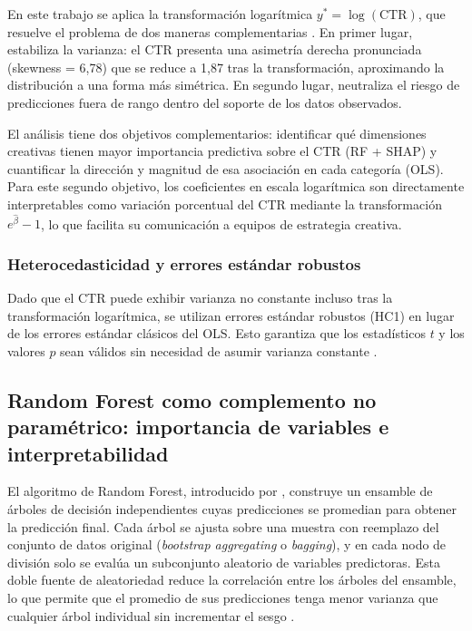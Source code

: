\documentclass[12pt, a4paper]{report}
\begin{document}
En este trabajo se aplica la transformación logarítmica $y^* = \log(\text{CTR})$,
que resuelve el problema de dos maneras complementarias \citep[Cap.~12]{fox2016}. En primer lugar, estabiliza
la varianza: el CTR presenta una asimetría derecha pronunciada (skewness = 6{,}78)
que se reduce a 1{,}87 tras la transformación, aproximando la distribución a una forma
más simétrica. En segundo lugar, neutraliza el riesgo de
predicciones fuera de rango dentro del soporte de los datos observados. 

El análisis tiene dos objetivos complementarios: identificar qué dimensiones creativas
tienen mayor importancia predictiva sobre el CTR (RF + SHAP) y cuantificar la dirección
y magnitud de esa asociación en cada categoría (OLS). Para este segundo objetivo, los
coeficientes en escala logarítmica son directamente interpretables como variación
porcentual del CTR mediante la transformación $e^{\hat{\beta}} - 1$, lo que facilita
su comunicación a equipos de estrategia creativa.

\subsubsection*{Heterocedasticidad y errores estándar robustos}

Dado que el CTR puede exhibir varianza no constante incluso tras la transformación
logarítmica, se utilizan errores estándar robustos (HC1) en lugar de los errores
estándar clásicos del OLS. Esto garantiza que los estadísticos $t$ y los valores $p$
sean válidos sin necesidad de asumir varianza constante \citep{white1980}.

\subsection{Random Forest como complemento no paramétrico:
            importancia de variables e interpretabilidad}

El algoritmo de Random Forest, introducido por \citet{breiman2001}, construye un
ensamble de árboles de decisión independientes cuyas predicciones se promedian para
obtener la predicción final. Cada árbol se ajusta sobre una muestra con reemplazo del
conjunto de datos original (\textit{bootstrap aggregating} o \textit{bagging}), y en
cada nodo de división solo se evalúa un subconjunto aleatorio de variables predictoras.
Esta doble fuente de aleatoriedad reduce la correlación entre los árboles del ensamble,
lo que permite que el promedio de sus predicciones tenga menor varianza que cualquier
árbol individual sin incrementar el sesgo \citep{breiman2001}.
\end{document}
